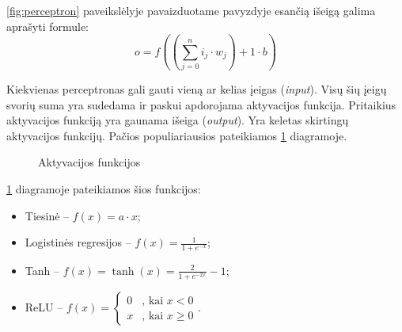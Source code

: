 \documentclass{VUMIFPSbakalaurinis}
\begin{document}
\ref{fig:perceptron} paveikslėlyje pavaizduotame pavyzdyje esančią išeigą galima aprašyti formule:
\begin{equation}
	o = f((\sum_{j=0}^{n}i_j \cdot w_j) + 1 \cdot b)
\end{equation}

Kiekvienas perceptronas gali gauti vieną ar kelias įeigas (\textit{input}). Visų šių įeigų svorių suma yra sudedama ir paskui apdorojama aktyvacijos funkcija. Pritaikius aktyvacijos funkciją yra gaunama išeiga (\textit{output}). Yra keletas skirtingų aktyvacijos funkcijų. Pačios populiariausios pateikiamos \ref{fig:aktyvacijosfunkc} diagramoje.
\begin{figure}[H]
	\centering
	
	
	\caption{Aktyvacijos funkcijos} \label{fig:aktyvacijosfunkc}
\end{figure}


\ref{fig:aktyvacijosfunkc} diagramoje pateikiamos šios funkcijos:

\begin{itemize}
	\item Tiesinė – $f(x) = a \cdot x$;
	\item Logistinės regresijos – $f(x) = \frac{1}{1+e^{-x}}$;
	\item Tanh – $f(x) = \tanh(x) = \frac{2}{1+e^{-2x}} - 1$;
	\item ReLU – $f(x) = \begin{cases}
	0 & \text{, kai } x < 0 \\
	x & \text{, kai } x \ge 0
	\end{cases} $.
\end{itemize}
\end{document}

